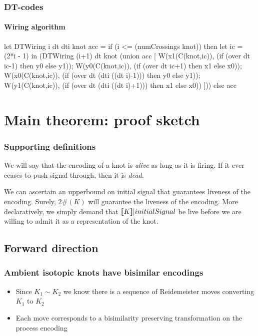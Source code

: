 \documentclass{beamer}
\begin{document}
\begin{frame}
  \frametitle{DT-codes}
  \framesubtitle{Wiring algorithm}
   let DTWiring i dt dti knot acc = 
     if (i <= (numCrossings knot)) 
     then 
       let ic = (2*i - 1) in 
         (DTWiring 
	      (i+1) dt knot 
	    (union  	    
	       acc 
	       [ W(x1(C(knot,ic)), 
		   (if (over dt ic-1) then y0 else y1)); 
	         W(y0(C(knot,ic)), 
		   (if (over dt ic+1) then x1 else x0)); 
	         W(x0(C(knot,ic)), 
		   (if (over dt (dti ((dt i)-1))) then y0 else y1)); 
	         W(y1(C(knot,ic)), 
		   (if (over dt (dti ((dt i)+1))) then x1 else x0)) ])) 
     else acc
\end{frame}

\section{Main theorem: proof sketch}

\begin{frame}
  \frametitle{Supporting definitions}
  \begin{definition}
    We will say that the encoding of a knot is \textit{alive} as long
    as it is firing. If it ever ceases to push signal through, then it
    is \textit{dead}.

    We can ascertain an upperbound on initial signal that guarantees
    liveness of the encoding. Surely, $2\#(K)$ will guarantee the
    liveness of the encoding. More declaratively, we simply demand
    that $ [\![ K ]\!] | initialSignal$ be live before we are willing to
    admit it as a representation of the knot.
  \end{definition}
\end{frame}

\subsection{Forward direction}

\begin{frame}
  \frametitle{Ambient isotopic knots have bisimilar encodings}
  \begin{itemize}
  \item Since $K_1 \sim K_2$ we know there is a sequence of
    Reidemeister moves converting $K_1$ to $K_2$
  \item Each move corresponds to a bisimilarity preserving
    transformation on the process encoding
  \end{itemize}
\end{frame}
\end{document}
